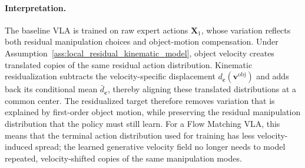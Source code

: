 \documentclass[10pt,twocolumn,letterpaper]{article}
\begin{document}
\paragraph{Interpretation.}
The baseline VLA is trained on raw expert actions $\mathbf X_1$, whose
variation reflects both residual manipulation choices and object-motion
compensation. Under Assumption~\ref{ass:local_residual_kinematic_model}, object
velocity creates translated copies of the same residual action distribution.
Kinematic residualization subtracts the velocity-specific displacement
$d_{\mathbf c}(\mathbf v^\text{obj})$ and adds back its conditional mean
$\bar d_{\mathbf c}$, thereby aligning these translated distributions at a
common center. The residualized target therefore removes variation that is
explained by first-order object motion, while preserving the residual
manipulation distribution that the policy must still learn. For a Flow Matching
VLA, this means that the terminal action distribution used for training has less
velocity-induced spread; the learned generative velocity field no longer needs
to model repeated, velocity-shifted copies of the same manipulation modes.
\end{document}
